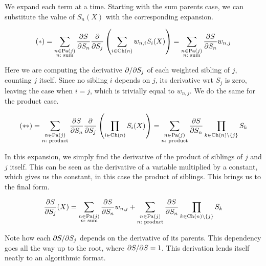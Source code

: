 We expand each term at a time. Starting with the sum parents case, we can substitute the value of
$S_n(X)$ with the corresponding expansion.

\begin{equation*}
  (\ast)=\sum_{\substack{n\in\operatorname*{\text{Pa}}(j)\\n:\text{ sum}}}\frac{\partial S}{\partial S_n}\frac{\partial}{\partial S_j}\left(\sum_{i\in\operatorname*{\text{Ch}}(n)}
    w_{n,i}S_i(X)\right)=\sum_{\substack{n\in\operatorname*{\text{Pa}}(j)\\n:\text{ sum}}}\frac{\partial S}{\partial S_n}w_{n,j}
\end{equation*}

Here we are computing the derivative $\partial/\partial S_j$ of each weighted sibling of $j$, counting $j$
itself. Since no sibling $i$ depends on $j$, its derivative wrt $S_j$ is zero, leaving the case
when $i=j$, which is trivially equal to $w_{n,j}$. We do the same for the product case.

\begin{equation*}
  (\ast\ast)=\sum_{\substack{n\in\operatorname*{\text{Pa}}(j)\\n:\text{ product}}}\frac{\partial S}{\partial S_n}\frac{\partial}{\partial S_j}\left(\prod_{i\in\operatorname*{\text{Ch}}(n)}
    S_i(X)\right)=\sum_{\substack{n\in\operatorname*{\text{Pa}}(j)\\n:\text{ product}}}\frac{\partial S}{\partial S_n}\prod_{k\in
      \operatorname*{\text{Ch}}(n)\setminus\{j\}}S_k
\end{equation*}

In this expansion, we simply find the derivative of the product of siblings of $j$ and $j$ itself.
This can be seen as the derivative of a variable multiplied by a constant, which gives us the
constant, in this case the product of siblings. This brings us to the final form.

\begin{equation}
  \frac{\partial S}{\partial S_j}(X)=\sum_{\substack{n\in\operatorname*{\text{Pa}}(j)\\n:\text{
        sum}}}\frac{\partial S}{\partial S_n}w_{n,j}+\sum_{\substack{n\in\operatorname*{\text{Pa}}(j)\\n: \text{
        product}}}\frac{\partial S}{\partial S_n}\prod_{k\in\operatorname*{\text{Ch}}(n)\setminus\{j\}}S_k
\end{equation}

Note how each $\partial S/\partial S_j$ depends on the derivative of its parents. This dependency goes all
the way up to the root, where $\partial S/\partial S=1$. This derivation lends itself neatly to an
algorithmic format.

